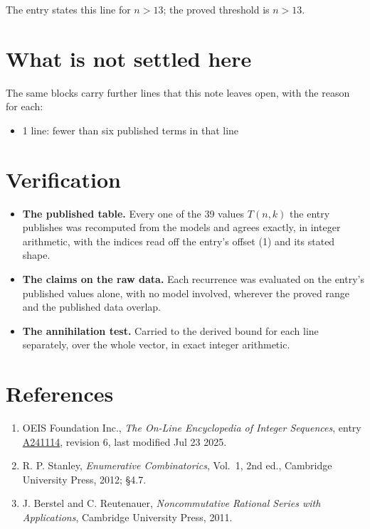 \documentclass[11pt]{article}
\theoremstyle{definition}
\begin{document}
The entry states this line for $n > 13$; the proved threshold is $n > 13$.

\section{What is not settled here}

The same blocks carry further lines that this note leaves open, with the reason for each:

\begin{itemize}

\item 1 line: fewer than six published terms in that line

\end{itemize}

\section{Verification}

\begin{itemize}

\item {\bfseries The published table.} Every one of the 39 values $T(n,k)$ the entry publishes was recomputed from the models and agrees exactly, in integer arithmetic, with the indices read off the entry's offset (1) and its stated shape.

\item {\bfseries The claims on the raw data.} Each recurrence was evaluated on the entry's published values alone, with no model involved, wherever the proved range and the published data overlap.

\item {\bfseries The annihilation test.} Carried to the derived bound for each line separately, over the whole vector, in exact integer arithmetic.

\end{itemize}

\section{References}

\begin{enumerate}

\item OEIS Foundation Inc., \emph{The On-Line Encyclopedia of Integer Sequences}, entry \href{https://oeis.org/A241114}{A241114}, revision 6, last modified Jul 23 2025.

\item R. P. Stanley, \emph{Enumerative Combinatorics}, Vol.~1, 2nd ed., Cambridge University Press, 2012; \S4.7.

\item J. Berstel and C. Reutenauer, \emph{Noncommutative Rational Series with Applications}, Cambridge University Press, 2011.

\end{enumerate}
\end{document}

